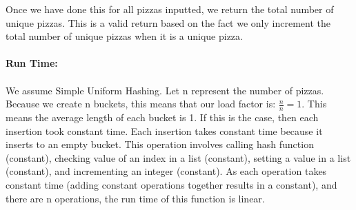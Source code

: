 \documentclass{assignment-263}
\begin{document}
\begin{enumerate}
Once we have done this for all pizzas inputted, we return the total number of unique pizzas. This is a valid return based on the fact we only increment the total number of unique pizzas when it is a unique pizza.\\\\
\textbf{Run Time:}\\\\
We assume Simple Uniform Hashing. Let n represent the number of pizzas. Because we create n buckets, this means that our load factor is: $\frac{n}{n} = 1$. This means the average length of each bucket is 1. If this is the case, then each insertion took constant time. Each insertion takes constant time because it inserts to an empty bucket. This operation involves calling hash function (constant), checking value of an index in a list (constant), setting a value in a list (constant), and incrementing an integer (constant). As each operation takes constant time (adding constant operations together results in a constant), and there are n operations, the run time of this function is linear.


 \end{enumerate}
\end{document}
